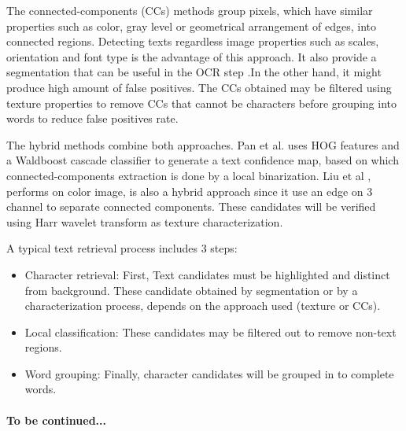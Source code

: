 \par
The connected-components (CCs) methods \cite{Epshtein.2010.CVPR} \cite{xucheng.2013.pami} group pixels, which have similar properties such as color, gray level or geometrical arrangement of edges, into connected regions. Detecting texts regardless image properties such as scales, orientation and font type is the advantage of this approach. It also provide a segmentation that can be useful in the OCR step .In the other hand, it might produce high amount of false positives. The CCs obtained may be filtered using texture properties to remove CCs that cannot be characters before grouping into words to reduce false positives rate.
\par
The hybrid methods combine both approaches. Pan et al. \cite{Pan2009} uses HOG features and a Waldboost cascade classifier to generate a text confidence map, based on which connected-components extraction is done by a local binarization. Liu et al \cite{Liu.2006.CRA}, performs on color image, is also a hybrid approach since it use an edge on 3 channel to separate connected components. These candidates will be verified using Harr wavelet transform as texture characterization.
\par
A typical text retrieval process includes 3 steps:
\begin{itemize}\item
Character retrieval: First, Text candidates must be highlighted and distinct from background. These candidate obtained by segmentation or by a characterization process, depends on the approach used (texture or CCs).
\item
Local classification: These candidates may be filtered out to remove non-text regions.
\item
Word grouping: Finally, character candidates will be grouped in to complete words. 
\end{itemize}
\paragraph{To be continued...}
